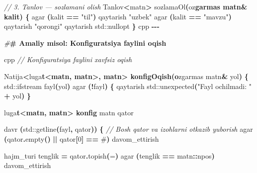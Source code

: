 \documentclass[a4paper,11pt,twoside,openright]{book}
\newenvironment{Shaded}{\begin{snugshade}}{\end{snugshade}}
\newcommand{\BuiltInTok}[1]{#1}
\newcommand{\CharTok}[1]{\textcolor[rgb]{0.31,0.60,0.02}{#1}}
\newcommand{\CommentTok}[1]{\textcolor[rgb]{0.56,0.35,0.01}{\textit{#1}}}
\newcommand{\DecValTok}[1]{\textcolor[rgb]{0.00,0.00,0.81}{#1}}
\newcommand{\ErrorTok}[1]{\textcolor[rgb]{0.64,0.00,0.00}{\textbf{#1}}}
\newcommand{\NormalTok}[1]{#1}
\newcommand{\OperatorTok}[1]{\textcolor[rgb]{0.81,0.36,0.00}{\textbf{#1}}}
\newcommand{\PreprocessorTok}[1]{\textcolor[rgb]{0.56,0.35,0.01}{\textit{#1}}}
\newcommand{\StringTok}[1]{\textcolor[rgb]{0.31,0.60,0.02}{#1}}
\begin{document}
\begin{Shaded}
\begin{Highlighting}[]
\CommentTok{// 3. Tanlov — sozlamani olish}
\NormalTok{Tanlov}\OperatorTok{\textless{}}\NormalTok{matn}\OperatorTok{\textgreater{}}\NormalTok{ sozlamaOl}\OperatorTok{(}\NormalTok{o}\CharTok{\textquotesingle{}z}\ErrorTok{garmas matn\& kalit) \{}
\NormalTok{    agar }\OperatorTok{(}\NormalTok{kalit }\OperatorTok{==} \StringTok{"til"}\OperatorTok{)}\NormalTok{ qaytarish }\StringTok{"uzbek"}
\NormalTok{    agar }\OperatorTok{(}\NormalTok{kalit }\OperatorTok{==} \StringTok{"mavzu"}\OperatorTok{)}\NormalTok{ qaytarish }\StringTok{"qorong\textquotesingle{}i"}
\NormalTok{    qaytarish }\BuiltInTok{std::}\NormalTok{nullopt}
\OperatorTok{\}}
\ErrorTok{\textasciigrave{}\textasciigrave{}\textasciigrave{}}\NormalTok{cpp}
\OperatorTok{{-}{-}{-}}

\PreprocessorTok{\#}\ErrorTok{\# Amaliy misol: Konfiguratsiya faylini o\textquotesingle{}qish}

\ErrorTok{\textasciigrave{}\textasciigrave{}\textasciigrave{}}\NormalTok{cpp}
\CommentTok{// Konfiguratsiya faylini xavfsiz o\textquotesingle{}qish}

\NormalTok{Natija}\OperatorTok{\textless{}}\NormalTok{lug}\CharTok{\textquotesingle{}a}\ErrorTok{t\textless{}matn, matn\textgreater{}, matn\textgreater{} konfigOqish(o}\CharTok{\textquotesingle{}}\NormalTok{zgarmas matn}\OperatorTok{\&}\NormalTok{ yol}\OperatorTok{)} \OperatorTok{\{}
    \BuiltInTok{std::}\NormalTok{ifstream fayl}\OperatorTok{(}\NormalTok{yol}\OperatorTok{)}
\NormalTok{    agar }\OperatorTok{(!}\NormalTok{fayl}\OperatorTok{)} \OperatorTok{\{}
\NormalTok{        qaytarish }\BuiltInTok{std::}\NormalTok{unexpected}\OperatorTok{(}\StringTok{"Fayl ochilmadi: "} \OperatorTok{+}\NormalTok{ yol}\OperatorTok{)}
    \OperatorTok{\}}

\NormalTok{    lug}\CharTok{\textquotesingle{}a}\ErrorTok{t\textless{}matn, matn\textgreater{} konfig}
\NormalTok{    matn qator}

\NormalTok{    davr }\OperatorTok{(}\BuiltInTok{std::}\NormalTok{getline}\OperatorTok{(}\NormalTok{fayl}\OperatorTok{,}\NormalTok{ qator}\OperatorTok{))} \OperatorTok{\{}
        \CommentTok{// Bo\textquotesingle{}sh qator va izohlarni o\textquotesingle{}tkazib yuborish}
\NormalTok{        agar }\OperatorTok{(}\NormalTok{qator}\OperatorTok{.}\NormalTok{empty}\OperatorTok{()} \OperatorTok{||}\NormalTok{ qator}\OperatorTok{[}\DecValTok{0}\OperatorTok{]} \OperatorTok{==} \CharTok{\textquotesingle{}\#\textquotesingle{}}\OperatorTok{)}\NormalTok{ davom\_ettirish}

\NormalTok{        hajm\_turi tenglik }\OperatorTok{=}\NormalTok{ qator}\OperatorTok{.}\NormalTok{topish}\OperatorTok{(}\CharTok{\textquotesingle{}=\textquotesingle{}}\OperatorTok{)}
\NormalTok{        agar }\OperatorTok{(}\NormalTok{tenglik }\OperatorTok{==}\NormalTok{ matn}\OperatorTok{::}\NormalTok{npos}\OperatorTok{)}\NormalTok{ davom\_ettirish}


\end{Highlighting}
\end{Shaded}
\end{document}
